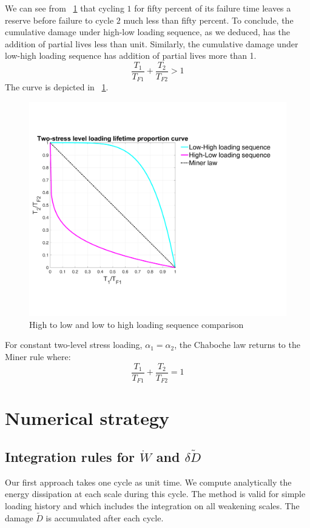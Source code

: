 \documentclass[3p,times,number,review]{elsarticle}
\newcommand{\figref}[1]{\figurename~\ref{#1}}
\begin{document}
We can see from \figref{fig.sequence} that cycling $1$ for fifty percent of its failure time leaves a reserve before failure to cycle $2$ much less than fifty percent. To conclude, the cumulative damage under high-low loading sequence, as we deduced, has the addition of partial lives less than unit. Similarly, the cumulative damage under low-high loading sequence has addition of partial lives more than 1.
$$\frac{T_1}{T_{F1}}+\frac{T_2}{T_{F2}}>1$$
 The curve is depicted in \figref{fig.sequence}.
\begin{figure}[!h]
	\centering
	\includegraphics[width=\textwidth]{figures//sequence.png} 
	\caption{High to low and low to high loading sequence comparison}
	\label{fig.sequence}
\end{figure}
For constant two-level stress loading, $\alpha_1=\alpha_2$, the Chaboche law returns to the Miner rule where:
$$\frac{T_1}{T_{F1}}+\frac{T_2}{T_{F2}}=1$$

\newpage
\section{Numerical strategy}
\subsection{Integration rules for $\dot{W}$ and $\delta \tilde{D}$}
Our first approach takes one cycle as unit time. We compute analytically the energy dissipation at each scale during this cycle. The method is valid for simple loading history and which includes the integration on all weakening scales. The damage $\tilde{D}$ is accumulated after each cycle.
\end{document}
